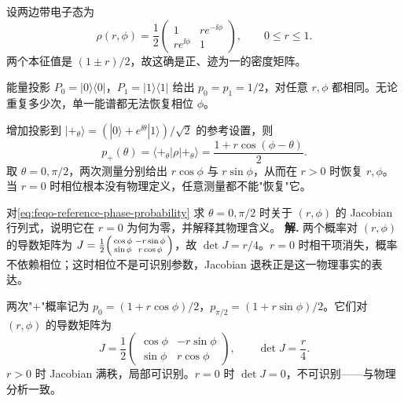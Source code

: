 设两边带电子态为
\begin{equation}
\rho(r,\phi)=\frac{1}{2}
\begin{pmatrix}1&r e^{-\ii\phi}\\r e^{\ii\phi}&1\end{pmatrix},
\qquad 0\leq r\leq 1.
\label{eq:feqo-two-level-state}
\end{equation}
两个本征值是 $(1\pm r)/2$，故这确是正、迹为一的密度矩阵。


\begin{exbox}[两能级相位的可识别性]
能量投影 $P_0=|0\rangle\langle 0|$，$P_1=|1\rangle\langle 1|$ 给出 $p_0=p_1=1/2$，对任意 $r,\phi$ 都相同。无论重复多少次，单一能谱都无法恢复相位 $\phi$。


增加投影到 $|+_\theta\rangle=(|0\rangle+e^{\ii\theta}|1\rangle)/\sqrt{2}$ 的参考设置，则
\begin{equation}
p_+(\theta)=\langle+_\theta|\rho|+_\theta\rangle
=\frac{1+r\cos(\phi-\theta)}{2}.
\label{eq:feqo-reference-phase-probability}
\end{equation}
取 $\theta=0,\pi/2$，两次测量分别给出 $r\cos\phi$ 与 $r\sin\phi$，从而在 $r>0$ 时恢复 $r,\phi$。当 $r=0$ 时相位根本没有物理定义，任意测量都不能"恢复"它。


\par
\begin{workedexample}
对\cref{eq:feqo-reference-phase-probability} 求 $\theta=0,\pi/2$ 时关于 $(r,\phi)$ 的 Jacobian 行列式，说明它在 $r=0$ 为何为零，并解释其物理含义。
\textbf{解.} 两个概率对 $(r,\phi)$ 的导数矩阵为 $J=\tfrac12\begin{psmallmatrix}\cos\phi&-r\sin\phi\\\sin\phi&r\cos\phi\end{psmallmatrix}$，故 $\det J=r/4$。$r=0$ 时相干项消失，概率不依赖相位；这时相位不是可识别参数，Jacobian 退秩正是这一物理事实的表达。
\end{workedexample}
\par

两次"$+$"概率记为 $p_0=(1+r\cos\phi)/2$，$p_{\pi/2}=(1+r\sin\phi)/2$。它们对 $(r,\phi)$ 的导数矩阵为
\begin{equation}
J=\frac{1}{2}
\begin{pmatrix}
\cos\phi&-r\sin\phi\\
\sin\phi&r\cos\phi
\end{pmatrix},
\qquad \det J=\frac{r}{4}.
\label{eq:feqo-jacobian-two-level}
\end{equation}
$r>0$ 时 Jacobian 满秩，局部可识别。$r=0$ 时 $\det J=0$，不可识别——与物理分析一致。

\end{exbox}


